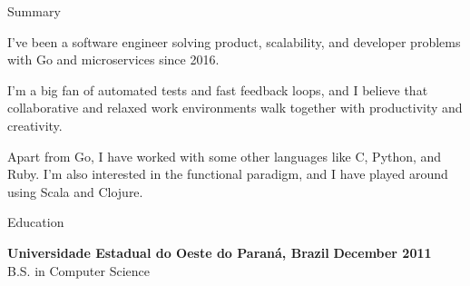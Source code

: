 \documentclass[
	a4paper, %
	10pt, %
]{resume} %
\begin{document}

\begin{rSection}{Summary}

I've been a software engineer solving product, scalability, and developer problems with Go and microservices since 2016.

I'm a big fan of automated tests and fast feedback loops, and I believe that collaborative and relaxed work environments walk together with productivity and creativity.

Apart from Go, I have worked with some other languages like C, Python, and Ruby.
I'm also interested in the functional paradigm, and I have played around using Scala and Clojure.

\end{rSection}


\begin{rSection}{Education}

	\textbf{Universidade Estadual do Oeste do Paraná, Brazil} \hfill \textbf{December 2011} \\
	B.S. in Computer Science

\end{rSection}


\end{document}
